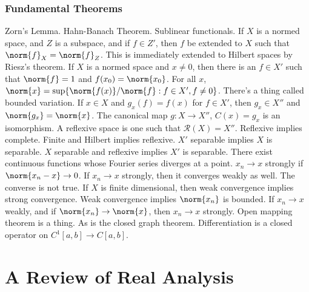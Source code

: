 \documentclass[crop=false,class=book,oneside]{standalone}
\begin{document}
            \subsubsection{Fundamental Theorems}
                Zorn's Lemma. Hahn-Banach Theorem. Sublinear functionals.
                If $X$ is a normed space, and $Z$ is a subspace, and if
                $f\in{Z'}$, then $f$ be extended to $X$ such that
                $\norm{f}_{X}=\norm{f}_{Z}$. This is immediately extended to
                Hilbert spaces by Riesz's theorem. If $X$ is a normed space
                and $x\ne{0}$, then there is an $f\in{X'}$ such that
                $\norm{f}=1$ and $f(x_{0})=\norm{x_{0}}$. For all $x$,
                $\norm{x}=\sup\{\norm{f(x)}/\norm{f}:f\in{X'},f\ne{0}\}$.
                There's a thing called bounded variation. If $x\in{X}$ and
                $g_{x}(f)=f(x)$ for $f\in{X'}$, then
                $g_{x}\in{X''}$ and $\norm{g_{x}}=\norm{x}$.
                The canonical map $g:X\rightarrow{X''}$,
                $C(x)=g_{x}$ is an isomorphism.
                A reflexive space is one such that
                $\mathscr{R}(X)=X''$.
                Reflexive implies complete. Finite and Hilbert implies
                reflexive.
                $X'$ separable implies $X$ is separable.
                $X$ separable and reflexive implies $X'$ is separable.
                There exist continuous functions whose Fourier series
                diverges at a point. $x_{n}\rightarrow{x}$ strongly if
                $\norm{x_{n}-x}\rightarrow{0}$. If $x_{n}\rightarrow{x}$
                strongly, then it converges weakly as well. The converse is
                not true. If $X$ is finite dimensional, then weak convergence
                implies strong convergence. Weak convergence implies
                $\norm{x_{n}}$ is bounded. If
                $x_{n}\rightarrow{x}$ weakly, and if
                $\norm{x_{n}}\rightarrow\norm{x}$, then
                $x_{n}\rightarrow{x}$ strongly. Open mapping theorem is
                a thing. As is the closed graph theorem. Differentiation
                is a closed operator on $C^{1}[a,b]\rightarrow{C[a,b]}$.
    \section{A Review of Real Analysis}
\end{document}

